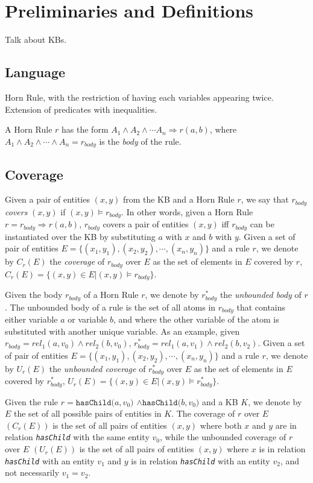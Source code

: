 \section{Preliminaries and Definitions}
{\color{red} Talk about KBs.}

\subsection{Language}
{\color{red} Horn Rule, with the restriction of having each variables appearing twice.
Extension of predicates with inequalities.}

A Horn Rule $r$ has the form $A_1 \wedge A_2 \wedge \cdots A_n \Rightarrow r(a,b)$, where  $A_1 \wedge A_2 \wedge \cdots \wedge A_n = r_{body}$ is the \emph{body} of the rule.

\subsection{Coverage}
Given a pair of entities $(x,y)$ from the KB and a Horn Rule $r$, we say that $r_{body}$ \emph{covers} $(x,y)$ if
$(x,y) \models r_{body}$. In other words, given a Horn Rule $r = r_{body} \Rightarrow r(a,b)$, $r_{body}$ covers a pair of entities $(x,y)$ iff $r_{body}$ can be instantiated over the KB by substituting $a$ with $x$ and $b$ with $y$. Given a set of pair of entities $E = \{(x_1,y_1),(x_2,y_2),\cdots,(x_n,y_n)\}$ and a rule $r$, we denote by $C_r(E)$ the \emph{coverage} of $r_{body}$ over $E$ as the set of elements in $E$ covered by $r$, $C_r(E)=\{(x,y) \in E | (x,y) \models r_{body}\}$.

Given the body $r_{body}$ of a Horn Rule $r$, we denote by $r^{*}_{body}$ the \emph{unbounded body} of $r$. The unbounded body of a rule is the set of all atoms in $r_{body}$ that contains either variable $a$ or variable $b$, and where the other variable of the atom is substituted with another unique variable. As an example, given $r_{body} = rel_1(a,v_0) \wedge rel_2(b,v_0)$, $r^{*}_{body} = rel_1(a,v_1) \wedge rel_2(b,v_2)$. 
Given a set of pair of entities $E = \{(x_1,y_1),(x_2,y_2),\cdots,(x_n,y_n)\}$ and a rule $r$, we denote by $U_r(E)$ the \emph{unbounded coverage} of $r^{*}_{body}$ over $E$ as the set of elements in $E$ covered by $r^{*}_{body}$, $U_r(E)=\{(x,y) \in E | (x,y) \models r^{*}_{body}\}$.

\begin{myExample}
	Given the rule \emph{$r=\texttt{hasChild(}a,v_0\texttt{)} $ $\wedge \texttt{hasChild(}b,v_0\texttt{)}$} and a KB $K$, we denote by $E$ the set of all possible pairs of entities in $K$.
	 The coverage of $r$ over $E$ $(C_r(E))$ is the set of all pairs of entities $(x,y)$ where both $x$ and $y$ are in relation \emph{\texttt{hasChild}} with the same entity $v_0$, while the unbounded coverage of $r$ over $E$ $(U_r(E))$ is the set of all pairs of entities $(x,y)$ where $x$ is in relation \emph{\texttt{hasChild}} with an entity $v_1$ and $y$ is in relation \emph{\texttt{hasChild}} with an entity $v_2$, and not necessarily $v_1 = v_2$. 
\end{myExample}

